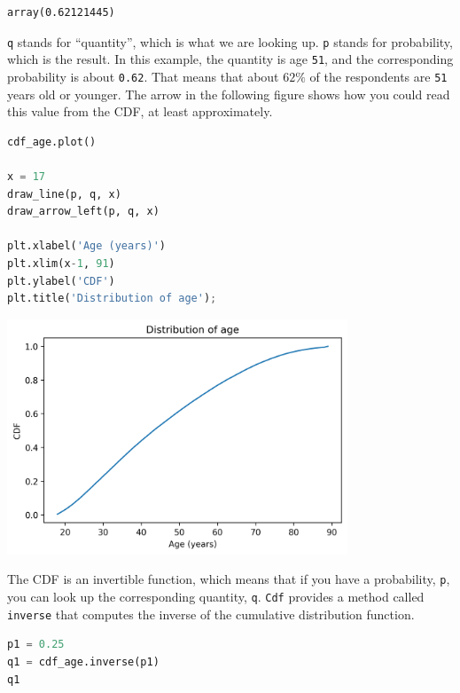 \begin{lstlisting}[style=output]
array(0.62121445)
\end{lstlisting}

\passthrough{\lstinline!q!} stands for ``quantity'', which is what we
are looking up. \passthrough{\lstinline!p!} stands for probability,
which is the result. In this example, the quantity is age
\passthrough{\lstinline!51!}, and the corresponding probability is about
\passthrough{\lstinline!0.62!}. That means that about \(62\%\) of the
respondents are \passthrough{\lstinline!51!} years old or younger. The
arrow in the following figure shows how you could read this value from
the CDF, at least approximately.

\begin{lstlisting}[language=Python,style=source]
cdf_age.plot()

x = 17
draw_line(p, q, x)
draw_arrow_left(p, q, x)

plt.xlabel('Age (years)')
plt.xlim(x-1, 91)
plt.ylabel('CDF')
plt.title('Distribution of age');
\end{lstlisting}

\begin{center}
\includegraphics[width=4in]{chapters/08_distributions_files/08_distributions_66_0.png}
\end{center}

The CDF is an invertible function, which means that if you have a
probability, \passthrough{\lstinline!p!}, you can look up the
corresponding quantity, \passthrough{\lstinline!q!}.
\passthrough{\lstinline!Cdf!} provides a method called
\passthrough{\lstinline!inverse!} that computes the inverse of the
cumulative distribution function.

\begin{lstlisting}[language=Python,style=source]
p1 = 0.25
q1 = cdf_age.inverse(p1)
q1
\end{lstlisting}

